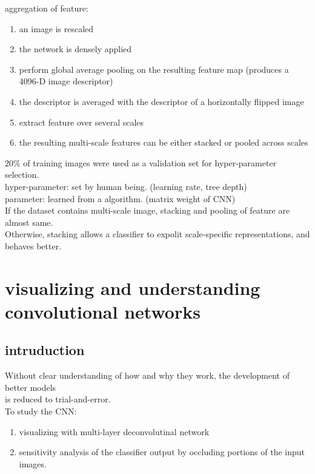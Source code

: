 \documentclass[11pt]{article}
\begin{document}
aggregation of feature: \\
\begin{enumerate}
\item an image is rescaled \\
\item the network is densely applied \\
\item perform global average pooling on the resulting feature map (produces a 4096-D image descriptor) \\
\item the descriptor is averaged with the descriptor of a horizontally flipped image \\
\item extract feature over several scales \\
\item the resulting multi-scale features can be either stacked or pooled across scales \\
\end{enumerate}



20\% of training images were used as a validation set for hyper-parameter selection. \\
hyper-parameter: set by human being. (learning rate, tree depth) \\
parameter: learned from a algorithm. (matrix weight of CNN) \\


If the dataset contains multi-scale image, stacking and pooling of feature are almost same. \\
Otherwise, stacking allows a classifier to expolit scale-specific representations, and behaves better. \\



\section{visualizing and understanding convolutional networks}
\label{sec-3}
\subsection{intruduction}
\label{sec-3-1}
Without clear understanding of how and why they work, the development of better models \\
is reduced to trial-and-error. \\

To study the CNN: \\
\begin{enumerate}
\item visualizing with multi-layer deconvolutinal network \\
\item sensitivity analysis of the classifier output by occluding portions of the input images. \\
\end{enumerate}
\end{document}
